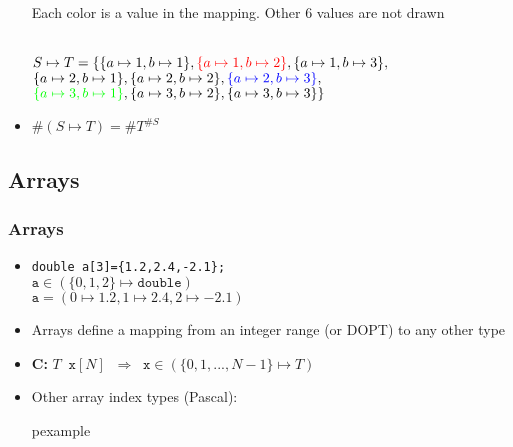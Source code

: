 \begin{frame}
\begin{itemize}
%
\hspace{2em}
{\small \begin{minipage}[b]{12em}Each color is a value in the mapping. Other 6 values are not drawn\\[2em]\end{minipage}}\\
{\small $S \mapsto T = \{ 
\{a\mapsto 1, b\mapsto 1\}, 
	{\color{red}\{a\mapsto 1, b\mapsto 2\}}, \{a\mapsto 1, b\mapsto 3\},$\\
$\{a\mapsto 2, b\mapsto 1\}, \{a\mapsto 2, b\mapsto 2\}, 
	{\color{blue}\{a\mapsto 2, b\mapsto 3\}},$\\
${\color{green}\{a\mapsto 3, b\mapsto 1\}},
	 \{a\mapsto 3, b\mapsto 2\}, \{a\mapsto 3, b\mapsto 3\}
\}$}
\item $\#(S \mapsto T) = $\pause  $\#T^{\#S}$
\end{itemize}
\end{frame}


\subsection{Arrays}
\begin{frame}
 \frametitle{Arrays}
\begin{itemize}
 \item \texttt{double a[3]=\{1.2,2.4,-2.1\};} \\
	$\mathtt{a} \in (\{0,1,2\} \mapsto \mathtt{double})$ \\
	$\mathtt{a} = (0\mapsto 1.2, 1\mapsto 2.4, 2\mapsto -2.1)$
 \item Arrays define a mapping from an integer range (or DOPT) to any other type
 \item \textbf{C:}
	$T\;\;\mathtt{x}[N]\;\;\Rightarrow\;\; \mathtt{x} \in 
		(\{0,1,..., N-1\} \mapsto T)$
 \item Other array index types (Pascal):
\begin{beamercolorbox}{pexample}
\codediziP
\end{beamercolorbox}

\end{itemize}
\end{frame}

